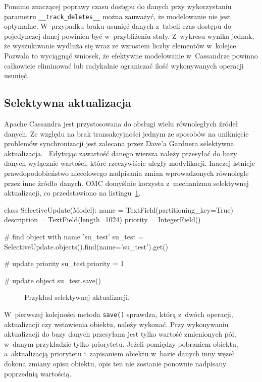 Pomimo znaczącej poprawy czasu dostępu do danych przy wykorzystaniu parametru \verb+__track_deletes__+ można zauważyć, że modelowanie nie jest optymalne. W~przypadku braku usunięć danych z~tabeli czas dostępu do pojedynczej danej powinien być w~przybliżeniu stały. Z~wykresu wynika jednak, że wyszukiwanie wydłuża się wraz ze wzrostem liczby elementów w~kolejce. Pozwala to wyciągnąć wniosek, że efektywne modelowanie w~Cassandrze powinno całkowicie eliminować lub radykalnie ograniczać ilość wykonywanych operacji usunięć.

\subsection{Selektywna aktualizacja}

Apache Cassandra jest przystosowana do obsługi wielu równoległych źródeł danych. Ze względu na brak transakcyjności jednym ze sposobów na uniknięcie problemów synchronizacji jest zalecana przez Dave'a Gardnera selektywna aktualizacja.~\cite{cassandra_concepts_patterns_antipatterns} Edytując zawartość danego wiersza należy przesyłać do bazy danych wyłącznie wartości, które rzeczywiście uległy modyfikacji. Inaczej istnieje prawdopodobieństwo niecelowego nadpisania zmian wprowadzonych równolegle przez inne źródło danych. OMC domyślnie korzysta z~mechanizmu selektywnej aktualizacji, co przedstawiono na listingu~\ref{lst:selective_update_modeling}.

\begin{verbbox}[\footnotesize]
class SelectiveUpdate(Model):
    name = TextField(partitioning_key=True)
    description = TextField(length=1024)
    priority = IntegerField()

# find object with name 'su_test'
su_test = SelectiveUpdate.objects().find(name='su_test').get()

# update priority
su_test.priority = 1

# update object
su_test.save()
\end{verbbox}

\begin{figure}[ht!]
	\centering
	\theverbbox
	\caption{Przykład selektywnej aktualizacji.}
	\label{lst:selective_update_modeling}
\end{figure}

W~pierwszej kolejności metoda \verb+save()+ sprawdza, którą z~dwóch operacji, aktualizacji czy wstawienia obiektu, należy wykonać. Przy wykonywaniu aktualizacji do bazy danych przesyłana jest tylko wartość zmienionych pól, w~danym przykładzie tylko priorytetu. Jeżeli pomiędzy pobraniem obiektu, a~aktualizacją priorytetu i~zapisaniem obiektu w~bazie danych inny węzeł dokona zmiany opisu obiektu, opis ten nie zostanie ponownie nadpisany poprzednią wartością.

